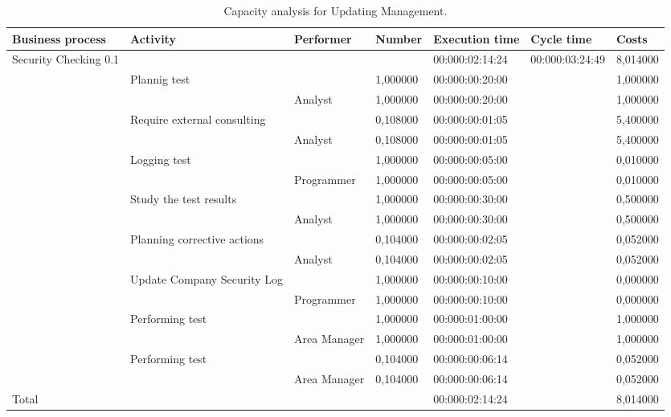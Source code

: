 \begin{landscape}
\begin{table}
\centering
{\tiny
\begin{tabular}{|l|l|l|l|l|l|l|}
Business process&Activity&Performer&Number&Execution time&Cycle time&Costs\\
\hline
Security Checking 0.1&&&&00:000:02:14:24&00:000:03:24:49&8,014000\\
\hline
&Plannig test &&1,000000&00:000:00:20:00&&1,000000\\
\hline
&&Analyst &1,000000&00:000:00:20:00&&1,000000\\
\hline
&Require external consulting &&0,108000&00:000:00:01:05&&5,400000\\
\hline
&&Analyst &0,108000&00:000:00:01:05&&5,400000\\
\hline
&Logging test &&1,000000&00:000:00:05:00&&0,010000\\
\hline
&&Programmer &1,000000&00:000:00:05:00&&0,010000\\
\hline
&Study the test results &&1,000000&00:000:00:30:00&&0,500000\\
\hline
&&Analyst &1,000000&00:000:00:30:00&&0,500000\\
\hline
&Planning corrective actions &&0,104000&00:000:00:02:05&&0,052000\\
\hline
&&Analyst &0,104000&00:000:00:02:05&&0,052000\\
\hline
&Update Company Security Log &&1,000000&00:000:00:10:00&&0,000000\\
\hline
&&Programmer &1,000000&00:000:00:10:00&&0,000000\\
\hline
&Performing test &&1,000000&00:000:01:00:00&&1,000000\\
\hline
&&Area Manager &1,000000&00:000:01:00:00&&1,000000\\
\hline
&Performing test &&0,104000&00:000:00:06:14&&0,052000\\
\hline
&&Area Manager &0,104000&00:000:00:06:14&&0,052000\\
\hline
Total&&&&00:000:02:14:24&&8,014000
\end{tabular}
}
\caption{Capacity analysis for Updating Management.}
\end{table}
\end{landscape}
%

%